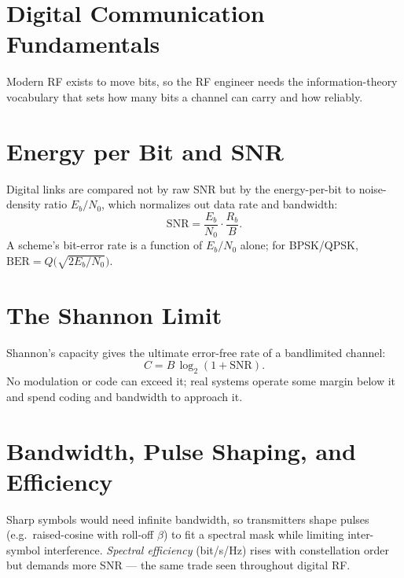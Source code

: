 \section{Digital Communication Fundamentals}\label{sec:tb_digital_comm}



Modern RF exists to move bits, so the RF engineer needs the information-theory
vocabulary that sets how many bits a channel can carry and how reliably.

\section{Energy per Bit and SNR}
Digital links are compared not by raw SNR but by the energy-per-bit to
noise-density ratio $E_b/N_0$, which normalizes out data rate and bandwidth:
\[ \text{SNR} = \frac{E_b}{N_0}\cdot\frac{R_b}{B}. \]
A scheme's bit-error rate is a function of $E_b/N_0$ alone; for BPSK/QPSK,
$\text{BER} = Q\!\big(\sqrt{2E_b/N_0}\big)$.

\section{The Shannon Limit}
Shannon's capacity gives the ultimate error-free rate of a bandlimited channel:
\[ C = B\,\log_2(1 + \text{SNR}). \]
No modulation or code can exceed it; real systems operate some margin below it and
spend coding and bandwidth to approach it.

\section{Bandwidth, Pulse Shaping, and Efficiency}
Sharp symbols would need infinite bandwidth, so transmitters shape pulses (e.g.\
raised-cosine with roll-off $\beta$) to fit a spectral mask while limiting
inter-symbol interference. \emph{Spectral efficiency} (bit/s/Hz) rises with
constellation order but demands more SNR --- the same trade seen throughout digital
RF.



